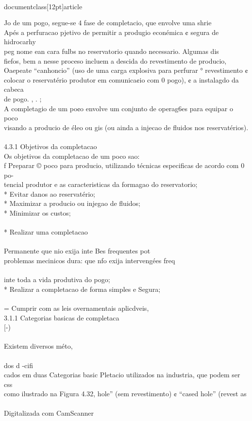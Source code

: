 \\documentclass[12pt]{article}
\begin{document}
Jo de um pogo, segue-se 4 fase de completacio, que envolve uma shrie\\
Apés a perfuracao pjetivo de permitir a produgio econémica ¢ segura de hidrocarhy\\
peg nome ean cara fulbs no reservatorio quando necessario. Algumas dis\\
fiefos, bem a nesse proceso incluem a descida do revestimento de producio,\\
Oaepeate “canhoncio” (uso de uma carga explosiva para perfurar ° revestimento ¢\\
colocar o reservatério produtor em comunica¢io com 0 pogo), ¢ a instalagdo da cabeca\\
de pogo. , . ;\\
A completagio de um po¢o envolve um conjunto de operag6es para equipar o poco\\
visando a producio de éleo ou gis (ou ainda a injecao de fluidos nos reservatérios).\\
\\
4.3.1 Objetivos da completacao\\
Os objetivos da completacao de um poco sao:\\
f Preparar © poco para producio, utilizando técnicas especificas de acordo com 0 po-\\
tencial produtor e as caracteristicas da formagao do reservatorio;\\
* Evitar danos ao reservatério;\\
* Maximizar a producio ou injegao de fluidos;\\
* Minimizar os custos;\\
\\
* Realizar uma completacao\\
\\
Permanente que nio exija inte Bes frequentes pot\\
problemas mecinicos dura: que nfo exija intervengées freq\\
\\
inte toda a vida produtiva do pogo;\\
* Realizar a completacao de forma simples e Segura;\\
\\
= Cumprir com as leis overnamentais aplicdveis,\\
3.1.1 Categorias basicas de completaca\\
[-)\\
\\
Existem diversos méto,\\
\\
dos d -cifi\\
cados em duas Categorias basic Pletacio utilizados na industria, que podem ser css\\
como ilustrado na Figura 4.32, hole” (sem revestimento) ¢ “cased hole” (revest as\\
\\
Digitalizada com CamScanner\\
\end{document}
